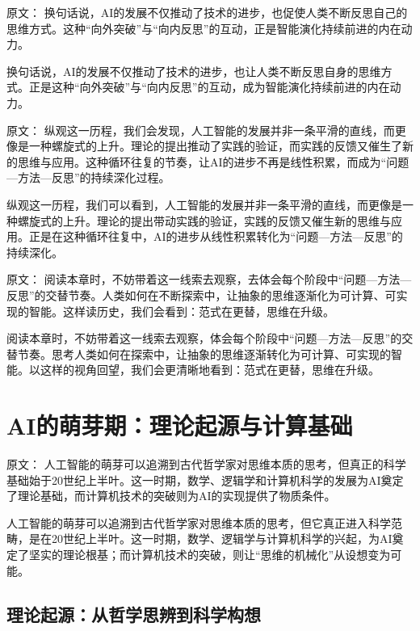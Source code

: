 原文：
换句话说，AI的发展不仅推动了技术的进步，也促使人类不断反思自己的思维方式。这种“向外突破”与“向内反思”的互动，正是智能演化持续前进的内在动力。

换句话说，AI的发展不仅推动了技术的进步，也让人类不断反思自身的思维方式。正是这种“向外突破”与“向内反思”的互动，成为智能演化持续前进的内在动力。

原文：
纵观这一历程，我们会发现，人工智能的发展并非一条平滑的直线，而更像是一种螺旋式的上升。理论的提出推动了实践的验证，而实践的反馈又催生了新的思维与应用。这种循环往复的节奏，让AI的进步不再是线性积累，而成为“问题—方法—反思”的持续深化过程。

纵观这一历程，我们可以看到，人工智能的发展并非一条平滑的直线，而更像是一种螺旋式的上升。理论的提出带动实践的验证，实践的反馈又催生新的思维与应用。正是在这种循环往复中，AI的进步从线性积累转化为“问题—方法—反思”的持续深化。

原文：
阅读本章时，不妨带着这一线索去观察，去体会每个阶段中“问题—方法—反思”的交替节奏。人类如何在不断探索中，让抽象的思维逐渐化为可计算、可实现的智能。这样读历史，我们会看到：范式在更替，思维在升级。

阅读本章时，不妨带着这一线索去观察，体会每个阶段中“问题—方法—反思”的交替节奏。思考人类如何在探索中，让抽象的思维逐渐转化为可计算、可实现的智能。以这样的视角回望，我们会更清晰地看到：范式在更替，思维在升级。

\section{AI的萌芽期：理论起源与计算基础}

原文：
人工智能的萌芽可以追溯到古代哲学家对思维本质的思考，但真正的科学基础始于20世纪上半叶。这一时期，数学、逻辑学和计算机科学的发展为AI奠定了理论基础，而计算机技术的突破则为AI的实现提供了物质条件。

人工智能的萌芽可以追溯到古代哲学家对思维本质的思考，但它真正进入科学范畴，是在20世纪上半叶。这一时期，数学、逻辑学与计算机科学的兴起，为AI奠定了坚实的理论根基；而计算机技术的突破，则让“思维的机械化”从设想变为可能。

\subsection{理论起源：从哲学思辨到科学构想}

